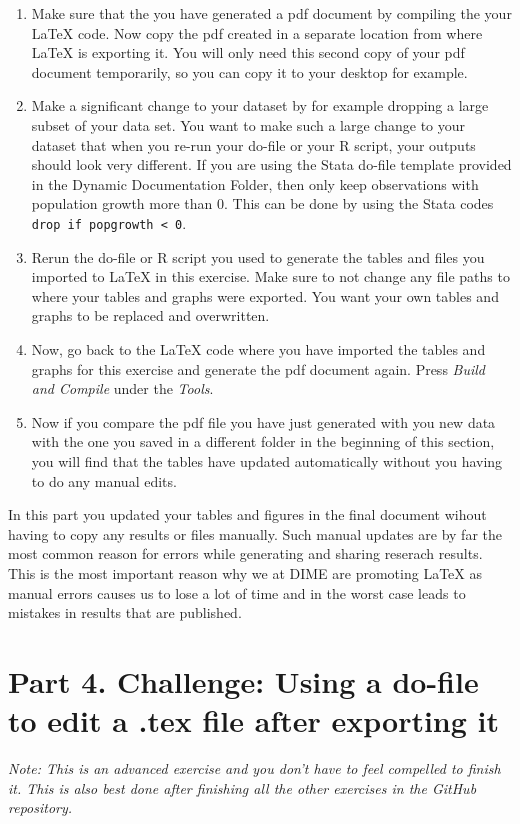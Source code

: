 \documentclass[12pts]{report}
\begin{document}
\begin{enumerate}
	\item Make sure that the you have generated a pdf document by compiling the your {\LaTeX} code. Now copy the pdf created in a separate location from where {\LaTeX} is exporting it. You will only need this second copy of your pdf document temporarily, so you can copy it to your desktop for example. 
	\item Make a significant change to your dataset by for example dropping a large subset of your data set. You want to make such a large change to your dataset that when you re-run your do-file or your R script, your outputs should look very different.
	\subitem If you are using the Stata do-file template provided in the Dynamic Documentation Folder, then only keep observations with population growth more than 0. This can be done by using the Stata codes \texttt{drop if popgrowth < 0}. 
	\item Rerun the do-file or R script you used to generate the tables and files you imported to {\LaTeX} in this exercise. Make sure to not change any file paths to where your tables and graphs were exported. You want your own tables and graphs to be replaced and overwritten.
	\item Now, go back to the {\LaTeX} code where you have imported the tables and graphs for this exercise and generate the pdf document again. Press \textit{Build and Compile} under the \textit{Tools}.
	\item Now if you compare the pdf file you have just generated with you new data with the one you saved in a different folder in the beginning of this section, you will find that the tables have updated automatically without you having to do any manual edits. 
\end{enumerate}

In this part you updated your tables and figures in the final document wihout having to copy any results or files manually. Such manual updates are by far the most common reason for errors while generating and sharing reserach results. This is the most important reason why we at DIME are promoting {\LaTeX} as manual errors causes us to lose a lot of time and in the worst case leads to mistakes in results that are published.

\section*{Part 4. Challenge: Using a do-file to edit a .tex file after exporting it}
\textit{Note: This is an advanced exercise and you don't have to feel compelled to finish it. This is also best done after finishing all the other exercises in the GitHub repository.}
 
\end{document}
